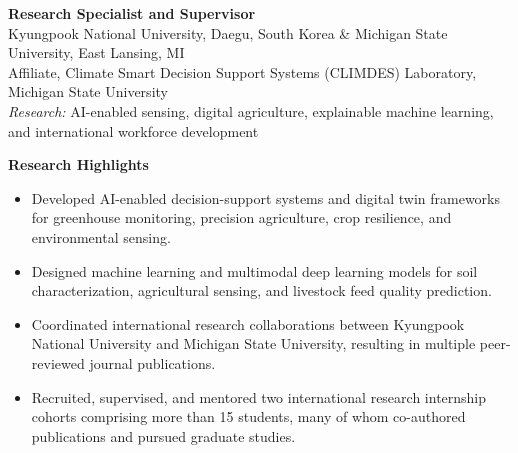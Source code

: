 \documentclass[11pt, letterpaper]{article}
\newcommand{\entry}[2]{%
  \begin{list}{}{%
    \setlength{\leftmargin}{0.17\linewidth}%
    \setlength{\labelwidth}{0.15\linewidth}%
    \setlength{\labelsep}{0.02\linewidth}%
    \setlength{\topsep}{3pt}%
    \setlength{\parsep}{2pt}%
    \setlength{\itemsep}{0pt}%
    \renewcommand{\makelabel}[1]{\parbox[t]{0.15\linewidth}{\small\raggedright\color{uwred}##1}\hfill}%
  }%
  \item[{#1}] #2%
  \end{list}%
}
\newcommand{\role}[1]{{\color{uwred}\textbf{#1}}}
\newcommand{\research}[1]{{\color{uwred}\textit{Research:}} #1}
\begin{document}
\entry{Aug 2022 --\\Jul 2024}{%
  \role{Research Specialist and Supervisor}\\
  Kyungpook National University, Daegu, South Korea \& Michigan State University, East Lansing, MI\\
  Affiliate, Climate Smart Decision Support Systems (CLIMDES) Laboratory, Michigan State University\\
  \research{AI-enabled sensing, digital agriculture, explainable machine learning, and international workforce development}


  \textbf{Research Highlights}
  \begin{itemize}
      \item Developed AI-enabled decision-support systems and digital twin frameworks for greenhouse monitoring, precision agriculture, crop resilience, and environmental sensing.
      \item Designed machine learning and multimodal deep learning models for soil characterization, agricultural sensing, and livestock feed quality prediction.
      \item Coordinated international research collaborations between Kyungpook National University and Michigan State University, resulting in multiple peer-reviewed journal publications.
      \item Recruited, supervised, and mentored two international research internship cohorts comprising more than 15 students, many of whom co-authored publications and pursued graduate studies.
  \end{itemize}
}
\end{document}
